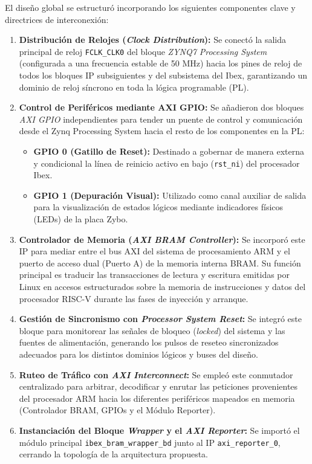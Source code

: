 El diseño global se estructuró incorporando los siguientes componentes clave y directrices de interconexión:

\begin{enumerate}
    \item \textbf{Distribución de Relojes (\textit{Clock Distribution}):} Se conectó la salida principal de reloj \texttt{FCLK\_CLK0} del bloque \textit{ZYNQ7 Processing System} (configurada a una frecuencia estable de 50 MHz) hacia los pines de reloj de todos los bloques IP subsiguientes y del subsistema del Ibex, garantizando un dominio de reloj síncrono en toda la lógica programable (PL).
    \item \textbf{Control de Periféricos mediante AXI GPIO:} Se añadieron dos bloques \textit{AXI GPIO} independientes para tender un puente de control y comunicación desde el Zynq Processing System hacia el resto de los componentes en la PL:
    \begin{itemize}
        \item \textbf{GPIO 0 (Gatillo de Reset):} Destinado a gobernar de manera externa y condicional la línea de reinicio activo en bajo (\texttt{rst\_ni}) del procesador Ibex.
        \item \textbf{GPIO 1 (Depuración Visual):} Utilizado como canal auxiliar de salida para la visualización de estados lógicos mediante indicadores físicos (LEDs) de la placa Zybo.
    \end{itemize}
    \item \textbf{Controlador de Memoria (\textit{AXI BRAM Controller}):} Se incorporó este IP para mediar entre el bus AXI del sistema de procesamiento ARM y el puerto de acceso dual (Puerto A) de la memoria interna BRAM. Su función principal es traducir las transacciones de lectura y escritura emitidas por Linux en accesos estructurados sobre la memoria de instrucciones y datos del procesador RISC-V durante las fases de inyección y arranque.
    \item \textbf{Gestión de Sincronismo con \textit{Processor System Reset}:} Se integró este bloque para monitorear las señales de bloqueo (\textit{locked}) del sistema y las fuentes de alimentación, generando los pulsos de reseteo sincronizados adecuados para los distintos dominios lógicos y buses del diseño.
    \item \textbf{Ruteo de Tráfico con \textit{AXI Interconnect}:} Se empleó este conmutador centralizado para arbitrar, decodificar y enrutar las peticiones provenientes del procesador ARM hacia los diferentes periféricos mapeados en memoria (Controlador BRAM, GPIOs y el Módulo Reporter).
    \item \textbf{Instanciación del Bloque \textit{Wrapper} y el \textit{AXI Reporter}:} Se importó el módulo principal \texttt{ibex\_bram\_wrapper\_bd} junto al IP \texttt{axi\_reporter\_0}, cerrando la topología de la arquitectura propuesta.
\end{enumerate}

